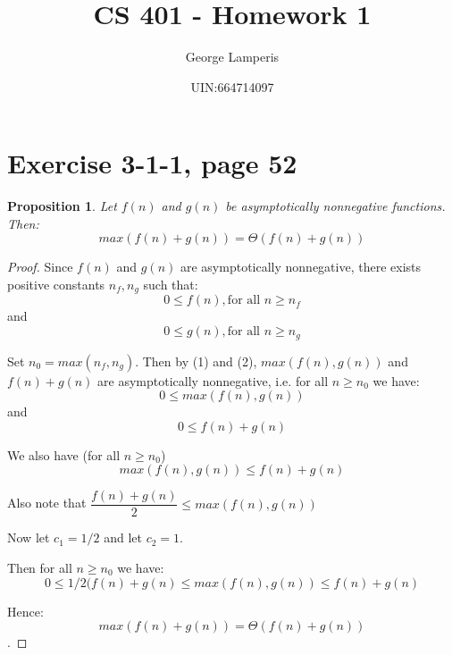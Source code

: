 \documentclass[letterpaper, 11pt]{article}
\title{CS 401 - Homework 1}
\author{George Lamperis}
\date{UIN:664714097}
\theoremstyle{mystyle}
\newtheorem*{prop}{Proposition}
\begin{document}
\maketitle


\section{Exercise 3-1-1, page 52}

\begin{prop}
    Let $f(n)$ and $g(n)$ be asymptotically nonnegative functions. Then:
    \[max(f(n) + g(n)) = \Theta (f(n) + g(n))\]
\end{prop}

\begin{proof}
    Since $f(n)$ and $g(n)$ are asymptotically nonnegative, there exists positive
    constants $n_f, n_g$ such that:
    \begin{equation} 0 \leq f(n), \text{for all } n \geq n_f \end{equation}
    and
    \begin{equation} 0 \leq g(n), \text{for all } n \geq n_g \end{equation}

    Set $n_0 = max(n_f, n_g)$. Then by (1) and (2), $max(f(n), g(n))$ and $f(n) + g(n)$ are asymptotically
    nonnegative, i.e. for all $n \geq n_0$ we have:
    \begin{equation} 0 \leq max(f(n), g(n)) \end{equation}
    and
    \begin{equation} 0 \leq f(n)+g(n) \end{equation}

    We also have (for all $n \geq n_0$)
    \begin{equation} max(f(n), g(n)) \leq f(n)+g(n) \end{equation}

    Also note that $ \dfrac{f(n)+g(n)}{2} \leq max(f(n), g(n))$

    Now let $c_1 = 1/2$ and let $c_2 = 1$.

    Then for all $n \geq n_0$ we have:
    \[ 0 \leq 1/2(f(n)+g(n) \leq max(f(n), g(n)) \leq f(n)+g(n)\]

    Hence: \[max(f(n) + g(n)) = \Theta (f(n) + g(n))\].
\end{proof}
\end{document}
